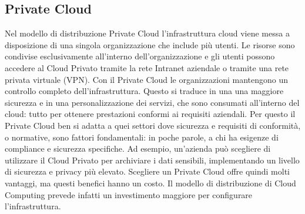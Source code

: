 \subsection{Private Cloud}
Nel modello di distribuzione Private Cloud l’infrastruttura cloud viene messa a disposizione di una singola organizzazione che include più utenti. Le risorse sono condivise esclusivamente all’interno dell’organizzazione e gli utenti possono accedere al Cloud Privato tramite la rete Intranet aziendale o tramite una rete privata virtuale (VPN).
Con il Private Cloud le organizzazioni mantengono un controllo completo dell’infrastruttura.
Questo si traduce in una una maggiore sicurezza e in una personalizzazione dei servizi, che sono consumati all’interno del cloud: tutto per ottenere prestazioni conformi ai requisiti aziendali.
Per questo il Private Cloud ben si adatta a quei settori dove sicurezza e requisiti di conformità, o normative, sono fattori fondamentali: in poche parole, a chi ha esigenze di compliance e sicurezza specifiche. Ad esempio, un’azienda può scegliere di utilizzare il Cloud Privato per archiviare i dati sensibili, implementando un livello di sicurezza e privacy più elevato.
Scegliere un Private Cloud offre quindi molti vantaggi, ma questi benefici hanno un costo. Il modello di distribuzione di Cloud Computing prevede infatti un investimento maggiore per configurare l’infrastruttura.